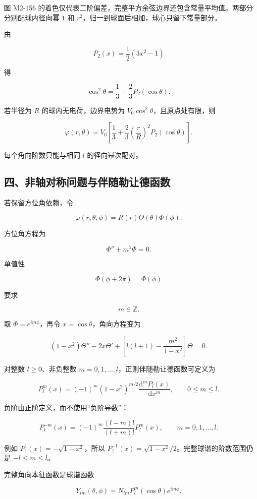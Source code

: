 图 M2-156
的着色仅代表二阶偏差，完整平方余弦边界还包含常量平均值。两部分分别配球内径向幂
\(1\) 和 \(r^2\)，归一到球面后相加，球心只留下常量部分。

由

\[
P_2(x)=\frac12(3x^2-1)
\]

得

\[
\cos^2\theta
=\frac13+\frac23P_2(\cos\theta).
\]

若半径为 \(R\) 的球内无电荷，边界电势为
\(V_0\cos^2\theta\)，且原点处有限，则

\[
\boxed{
\varphi(r,\theta)
=V_0\left[
\frac13+\frac23\left(\frac rR\right)^2
P_2(\cos\theta)
\right]
}.
\]

每个角向阶数只能与相同 \(l\) 的径向幂次配对。

\subsection{四、非轴对称问题与伴随勒让德函数}\label{m2:ux56dbux975eux8f74ux5bf9ux79f0ux95eeux9898ux4e0eux4f34ux968fux52d2ux8ba9ux5fb7ux51fdux6570}

若保留方位角依赖，令

\[
\varphi(r,\theta,\phi)
=R(r)\Theta(\theta)\Phi(\phi).
\]

方位角方程为

\[
\Phi''+m^2\Phi=0.
\]

单值性

\[
\Phi(\phi+2\pi)=\Phi(\phi)
\]

要求

\[
\boxed{m\in\mathbb Z}.
\]

取 \(\Phi=e^{im\phi}\)，再令 \(x=\cos\theta\)，角向方程变为

\[
\boxed{
(1-x^2)\Theta''-2x\Theta'
+\left[
l(l+1)-\frac{m^2}{1-x^2}
\right]\Theta=0
}.
\]

对整数 \(l\ge0\)、非负整数
\(m=0,1,\ldots,l\)，正则伴随勒让德函数可定义为

\[
\boxed{
P_l^m(x)=(-1)^m(1-x^2)^{m/2}
\frac{\mathrm d^mP_l(x)}{\mathrm dx^m}
},\qquad 0\le m\le l.
\]

负阶由正阶定义，而不使用``负阶导数''：

\[
\boxed{P_l^{-m}(x)=(-1)^m\frac{(l-m)!}{(l+m)!}P_l^m(x)},
\qquad m=0,1,\ldots,l.
\]

例如 \(P_1^1(x)=-\sqrt{1-x^2}\)，所以
\(P_1^{-1}(x)=\sqrt{1-x^2}/2\)。完整球谐的阶数范围仍是
\(-l\le m\le l\)。

完整角向本征函数是球谐函数

\[
Y_{lm}(\theta,\phi)
=N_{lm}P_l^m(\cos\theta)e^{im\phi}.
\]

